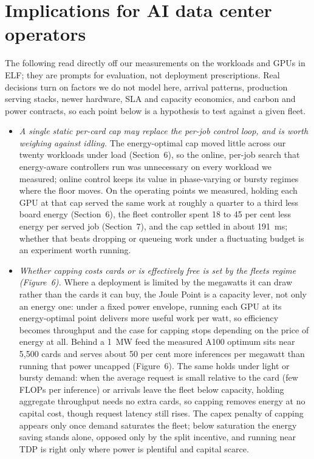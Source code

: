 \section{Implications for AI data center operators}\label{implications-for-ai-data-center-operators}

The following read directly off our measurements on the workloads and GPUs in ELF; they are prompts for
evaluation, not deployment prescriptions. Real decisions turn on factors we do not model here, arrival patterns,
production serving stacks, newer hardware, SLA and capacity economics, and carbon and power contracts, so each
point below is a hypothesis to test against a given fleet.

\begin{itemize}
\tightlist
\item
  \emph{A single static per-card cap may replace the per-job control loop, and is worth weighing against idling.} The energy-optimal cap moved little across our twenty workloads under load (Section~6), so the online, per-job search that energy-aware controllers run was unnecessary on every workload we measured; online control keeps its value in phase-varying or bursty regimes where the floor moves. On the operating points we measured, holding each GPU at that cap served the same work at roughly a quarter to a third less board energy (Section~6), the fleet controller spent 18 to 45 per cent less energy per served job (Section~7), and the cap settled in about 191~ms; whether that beats dropping or queueing work under a fluctuating budget is an experiment worth running.
\item
  \emph{Whether capping costs cards or is effectively free is set by the fleet\textquotesingle s regime (Figure~6).} Where a deployment is limited by the megawatts it can draw rather than the cards it can buy, the Joule Point is a capacity lever, not only an energy one: under a fixed power envelope, running each GPU at its energy-optimal point delivers more useful work per watt, so efficiency becomes throughput and the case for capping stops depending on the price of energy at all. Behind a 1~MW feed the measured A100 optimum sits near 5,500 cards and serves about 50 per cent more inferences per megawatt than running that power uncapped (Figure~6). The same holds under light or bursty demand: when the average request is small relative to the card (few FLOPs per inference) or arrivals leave the fleet below capacity, holding aggregate throughput needs no extra cards, so capping removes energy at no capital cost, though request latency still rises. The capex penalty of capping appears only once demand saturates the fleet; below saturation the energy saving stands alone, opposed only by the split incentive, and running near TDP is right only where power is plentiful and capital scarce.

\end{itemize}
